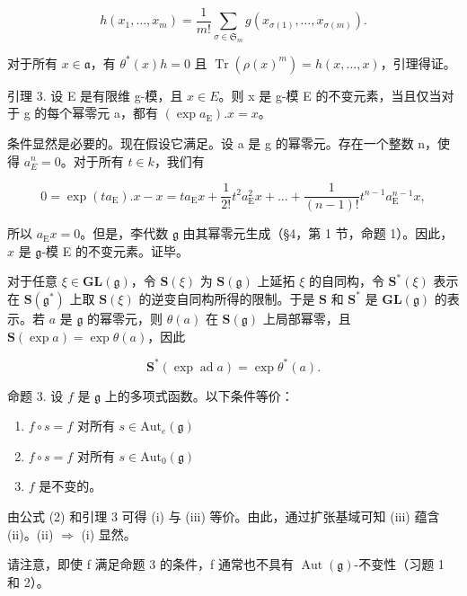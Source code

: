 \[
h (x _ {1}, \dots , x _ {m}) = \frac {1}{m !} \sum_ {\sigma \in \mathfrak {S} _ {m}} g (x _ {\sigma (1)}, \dots , x _ {\sigma (m)}).
\]

对于所有 \(x \in \mathfrak{a}\)，有 \(\theta^{*}(x)h = 0\) 且 \(\operatorname{Tr}(\rho(x)^m) = h(x, \ldots, x)\)，引理得证。

引理 3. 设 E 是有限维 g-模，且 \(x \in E\)。则 x 是 g-模 E 的不变元素，当且仅当对于 g 的每个幂零元 a，都有 \((\exp a_{\mathrm{E}}).x = x\)。

条件显然是必要的。现在假设它满足。设 a 是 g 的幂零元。存在一个整数 n，使得 \(a_{E}^{n}=0\)。对于所有 \(t\in k\)，我们有

\[
0 = \exp (t a _ {\mathrm{E}}). x - x = t a _ {\mathrm{E}} x + \frac {1}{2 !} t ^ {2} a _ {\mathrm{E}} ^ {2} x + \dots + \frac {1}{(n - 1) !} t ^ {n - 1} a _ {\mathrm{E}} ^ {n - 1} x,
\]

所以 \(a_{\mathrm{E}}x = 0\)。但是，李代数 \(\mathfrak{g}\) 由其幂零元生成（§4，第 1 节，命题 1）。因此，\(x\) 是 \(\mathfrak{g}\)-模 E 的不变元素。证毕。

对于任意 \(\xi \in \mathbf{GL}(\mathfrak{g})\)，令 \(\mathbf{S}(\xi)\) 为 \(\mathbf{S}(\mathfrak{g})\) 上延拓 \(\xi\) 的自同构，令 \(\mathbf{S}^*(\xi)\) 表示在 \(\mathbf{S}(\mathfrak{g}^*)\) 上取 \(\mathbf{S}(\xi)\) 的逆变自同构所得的限制。于是 \(\mathbf{S}\) 和 \(\mathbf{S}^*\) 是 \(\mathbf{GL}(\mathfrak{g})\) 的表示。若 \(a\) 是 \(\mathfrak{g}\) 的幂零元，则 \(\theta(a)\) 在 \(\mathbf{S}(\mathfrak{g})\) 上局部幂零，且 \(\mathbf{S}(\exp a) = \exp \theta(a)\)，因此

\[
\mathbf {S} ^ {*} (\exp \operatorname{ad} a) = \exp \theta^ {*} (a).\tag{2}
\]

命题 3. 设 \(f\) 是 \(\mathfrak{g}\) 上的多项式函数。以下条件等价：

\begin{enumerate}
\def\labelenumi{(\roman{enumi})}
\item
  \(f\circ s = f\) 对所有 \(s\in \mathrm{Aut}_e(\mathfrak{g})\)
\item
  \(f\circ s = f\) 对所有 \(s\in \mathrm{Aut}_0(\mathfrak{g})\)
\item
  \(f\) 是不变的。
\end{enumerate}

由公式 (2) 和引理 3 可得 (i) 与 (iii) 等价。由此，通过扩张基域可知 (iii) 蕴含 (ii)。(ii) \(\Longrightarrow\) (i) 显然。

请注意，即使 f 满足命题 3 的条件，f 通常也不具有 \(\operatorname{Aut}(\mathfrak{g})\)-不变性（习题 1 和 2）。

